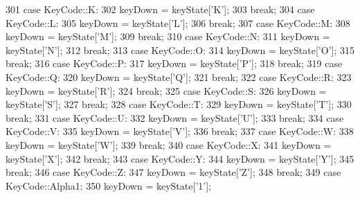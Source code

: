 \begin{DoxyCode}
301     \textcolor{keywordflow}{case} KeyCode::K:
302         keyDown = keyState[\textcolor{charliteral}{'K'}];
303         \textcolor{keywordflow}{break};
304     \textcolor{keywordflow}{case} KeyCode::L:
305         keyDown = keyState[\textcolor{charliteral}{'L'}];
306         \textcolor{keywordflow}{break};
307     \textcolor{keywordflow}{case} KeyCode::M:
308         keyDown = keyState[\textcolor{charliteral}{'M'}];
309         \textcolor{keywordflow}{break};
310     \textcolor{keywordflow}{case} KeyCode::N:
311         keyDown = keyState[\textcolor{charliteral}{'N'}];
312         \textcolor{keywordflow}{break};
313     \textcolor{keywordflow}{case} KeyCode::O:
314         keyDown = keyState[\textcolor{charliteral}{'O'}];
315         \textcolor{keywordflow}{break};
316     \textcolor{keywordflow}{case} KeyCode::P:
317         keyDown = keyState[\textcolor{charliteral}{'P'}];
318         \textcolor{keywordflow}{break};
319     \textcolor{keywordflow}{case} KeyCode::Q:
320         keyDown = keyState[\textcolor{charliteral}{'Q'}];
321         \textcolor{keywordflow}{break};
322     \textcolor{keywordflow}{case} KeyCode::R:
323         keyDown = keyState[\textcolor{charliteral}{'R'}];
324         \textcolor{keywordflow}{break};
325     \textcolor{keywordflow}{case} KeyCode::S:
326         keyDown = keyState[\textcolor{charliteral}{'S'}];
327         \textcolor{keywordflow}{break};
328     \textcolor{keywordflow}{case} KeyCode::T:
329         keyDown = keyState[\textcolor{charliteral}{'T'}];
330         \textcolor{keywordflow}{break};
331     \textcolor{keywordflow}{case} KeyCode::U:
332         keyDown = keyState[\textcolor{charliteral}{'U'}];
333         \textcolor{keywordflow}{break};
334     \textcolor{keywordflow}{case} KeyCode::V:
335         keyDown = keyState[\textcolor{charliteral}{'V'}];
336         \textcolor{keywordflow}{break};
337     \textcolor{keywordflow}{case} KeyCode::W:
338         keyDown = keyState[\textcolor{charliteral}{'W'}];
339         \textcolor{keywordflow}{break};
340     \textcolor{keywordflow}{case} KeyCode::X:
341         keyDown = keyState[\textcolor{charliteral}{'X'}];
342         \textcolor{keywordflow}{break};
343     \textcolor{keywordflow}{case} KeyCode::Y:
344         keyDown = keyState[\textcolor{charliteral}{'Y'}];
345         \textcolor{keywordflow}{break};
346     \textcolor{keywordflow}{case} KeyCode::Z:
347         keyDown = keyState[\textcolor{charliteral}{'Z'}];
348         \textcolor{keywordflow}{break};
349     \textcolor{keywordflow}{case} KeyCode::Alpha1:
350         keyDown = keyState[\textcolor{charliteral}{'1'}];

\end{DoxyCode}
